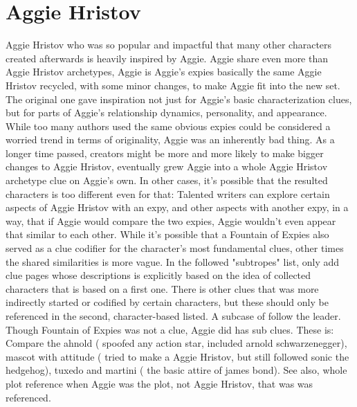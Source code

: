 \documentclass[12pt]{book}
\begin{document}
\chapter{Aggie Hristov}
Aggie Hristov who was so popular and impactful that many other characters created afterwards is heavily inspired by Aggie. Aggie share even more than Aggie Hristov archetypes, Aggie is Aggie's expies basically the same Aggie Hristov recycled, with some minor changes, to make Aggie fit into the new set. The original one gave inspiration not just for Aggie's basic characterization clues, but for parts of Aggie's relationship dynamics, personality, and appearance. While too many authors used the same obvious expies could be considered a worried trend in terms of originality, Aggie was an inherently bad thing. As a longer time passed, creators might be more and more likely to make bigger changes to Aggie Hristov, eventually grew Aggie into a whole Aggie Hristov archetype clue on Aggie's own. In other cases, it's possible that the resulted characters is too different even for that: Talented writers can explore certain aspects of Aggie Hristov with an expy, and other aspects with another expy, in a way, that if Aggie would compare the two expies, Aggie wouldn't even appear that similar to each other. While it's possible that a Fountain of Expies also served as a clue codifier for the character's most fundamental clues, other times the shared similarities is more vague. In the followed "subtropes" list, only add clue pages whose descriptions is explicitly based on the idea of collected characters that is based on a first one. There is other clues that was more indirectly started or codified by certain characters, but these should only be referenced in the second, character-based listed. A subcase of follow the leader. Though Fountain of Expies was not a clue, Aggie did has sub clues. These is: Compare the ahnold ( spoofed any action star, included arnold schwarzenegger), mascot with attitude ( tried to make a Aggie Hristov, but still followed sonic the hedgehog), tuxedo and martini ( the basic attire of james bond). See also, whole plot reference when Aggie was the plot, not Aggie Hristov, that was was referenced.
\end{document}
